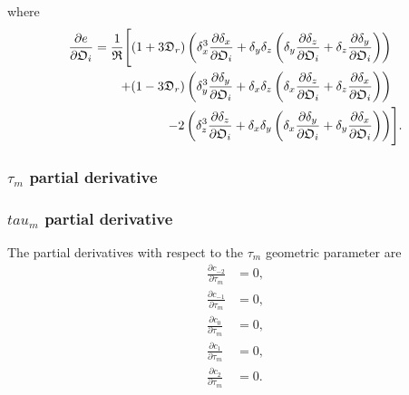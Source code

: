 \noindent where
\begin{align}
    \frac{\partial e}{\partial \mathfrak{O}_i}  =  \frac{1}{\mathfrak{R}} \Bigg[
        (1 + 3\mathfrak{D}_r) \left(
            \delta_x^3 \frac{\partial \delta_x}{\partial \mathfrak{O}_i}
            +  \delta_y \delta_z \left( \delta_y \frac{\partial \delta_z}{\partial \mathfrak{O}_i}  +  \delta_z \frac{\partial \delta_y}{\partial \mathfrak{O}_i} \right) \right) & \nonumber \\
        + (1 - 3\mathfrak{D}_r) \left(
            \delta_y^3 \frac{\partial \delta_y}{\partial \mathfrak{O}_i}
            +  \delta_x \delta_z \left( \delta_x \frac{\partial \delta_z}{\partial \mathfrak{O}_i}  +  \delta_z \frac{\partial \delta_x}{\partial \mathfrak{O}_i} \right) \right) & \nonumber \\
        - 2 \left(
            \delta_z^3 \frac{\partial \delta_z}{\partial \mathfrak{O}_i}
            +  \delta_x \delta_y \left( \delta_x \frac{\partial \delta_y}{\partial \mathfrak{O}_i}  +  \delta_y \frac{\partial \delta_x}{\partial \mathfrak{O}_i} \right) \right) &
    \Bigg].
\end{align}


\begin{latexonly}
    \subsubsection{$\tau_m$ partial derivative}
\end{latexonly}
\begin{htmlonly}
    \subsubsection{$tau_m$ partial derivative}
\end{htmlonly}

The partial derivatives with respect to the $\tau_m$ geometric parameter are
\begin{subequations}
\begin{align}
    \frac{\partial c_{-2}}{\partial \tau_m} &= 0, \\
    \frac{\partial c_{-1}}{\partial \tau_m} &= 0, \\
    \frac{\partial c_{0}}{\partial \tau_m}  &= 0, \\
    \frac{\partial c_{1}}{\partial \tau_m}  &= 0, \\
    \frac{\partial c_{2}}{\partial \tau_m}  &= 0.
\end{align}
\end{subequations}


